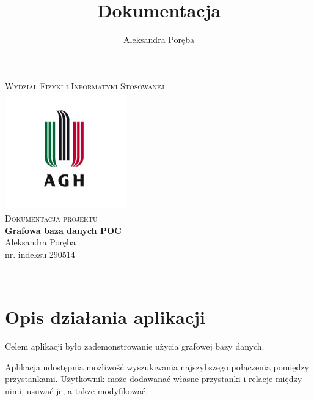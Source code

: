 \documentclass[12pt]{article}
\title{Dokumentacja}
\author{Aleksandra Poręba}
\makeatletter
\let\thetitle\@title
\let\theauthor\@author
\makeatother
\begin{document}
\begin{center}
\textsc{\normalsize Wydział Fizyki i Informatyki Stosowanej}\\[2.0cm] 
\includegraphics[scale = 1]{logo.png}\\[1cm] 
\textsc{\Large Dokumentacja projektu}\\[0.4cm] 

{ \huge \bfseries \LARGE{Grafowa baza danych POC} }\\[1cm] 

\flushright \Large Aleksandra Poręba \\ nr. indeksu 290514

\vfill 

\center {\today}\\[2cm] 

\pagebreak 

\end{center}

\tableofcontents
\pagebreak


\pagestyle{fancy}
\fancyhf{}

\rhead{\theauthor}
\lhead{\thetitle}
\cfoot{\thepage}

\section{Opis działania aplikacji}
Celem aplikacji było zademonstrowanie użycia grafowej bazy danych.

Aplikacja udostępnia możliwość wyszukiwania najszybszego połączenia pomiędzy przystankami. Użytkownik może dodawanać własne przystanki i relacje między nimi, usuwać je, a także modyfikować.
\end{document}
